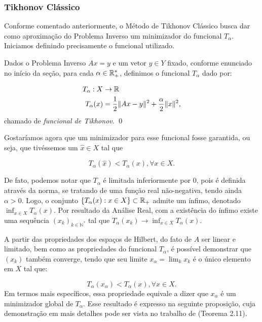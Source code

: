 \subsubsection{Tikhonov Clássico}

Conforme comentado anteriormente, o Método de Tikhonov Clássico busca dar como aproximação do Problema Inverso um minimizador do funcional $T_\alpha$. Iniciamos definindo precisamente o funcional utilizado.

\begin{defin}\label{def:funcional-tikhonov}

Dados o Problema Inverso $Ax=y$ e um vetor $y\in Y$ fixado, conforme enunciado no início da seção, para cada $\alpha \in \mathbb{R}^*_+$, definimos o funcional $T_\alpha$ dado por:

\begin{align*}
    T_\alpha : X &\to \mathbb{R}\\
    T_\alpha(x) &= \frac 1 2 \| Ax-y\|^2 + \frac \alpha 2 \| x \|^2,
\end{align*}
chamado de \textit{funcional de Tikhonov}. \qed
\end{defin}

Gostaríamos agora que um minimizador para esse funcional fosse garantida, ou seja, que tivéssemos um $\hat x\in X$ tal que

\begin{equation*}
    T_\alpha(\hat x) < T_\alpha (x), \forall x \in X.
\end{equation*}

De fato, podemos notar que $T_\alpha$ é limitada inferiormente por 0, pois é definida através da norma, se tratando de uma função real não-negativa, tendo ainda $\alpha>0$. Logo, o conjunto $\{T_\alpha (x): x \in X\} \subset \mathbb{R}_+$ admite um ínfimo, denotado $\inf_{x \in X} T_\alpha (x)$. Por resultado da Análise Real, com a existência do ínfimo existe uma sequência $(x_k)_{k \in \mathbb N^*}$ tal que $T_\alpha(x_k) \to \inf_{x \in X} T_\alpha (x)$. 

A partir das propriedades dos espaços de Hilbert, do fato de $A$ ser linear e limitado, bem como as propriedades do funcional $T_\alpha$, é possível demonstrar que $(x_k)$ também converge, tendo que seu limite  $x_\alpha = \lim_k x_k$ é o único elemento em $X$ tal que:

\begin{equation*}
    T_\alpha(x_\alpha) < T_\alpha(x), \forall x \in X.
\end{equation*}
Em termos mais específicos, essa propriedade equivale a dizer que $x_\alpha$ é um minimizador global de $T_\alpha$. Esse resultado é expresso na seguinte proposição, cuja demonstração em mais detalhes pode ser vista no trabalho de  (Teorema 2.11).

